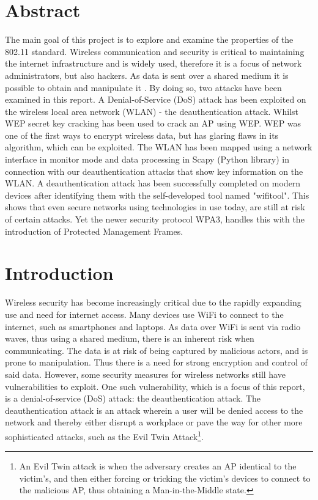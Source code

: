 \section*{Abstract}
The main goal of this project is to explore and examine the properties of the 802.11 standard. Wireless communication and security is critical to maintaining the internet infrastructure and is widely used, therefore it is a focus of network administrators, but also hackers. As data is sent over a shared medium it is possible to obtain and manipulate it . By doing so, two attacks have been examined in this report. A Denial-of-Service (DoS) attack has been exploited on the wireless local area network (WLAN) - the deauthentication attack. Whilst WEP secret key cracking has been used to crack an AP using WEP. WEP was one of the first ways to encrypt wireless data, but has glaring flaws in its algorithm, which can be exploited. The WLAN has been mapped using a network interface in monitor mode and data processing in Scapy (Python library) in connection with our deauthentication attacks that show key information on the WLAN. A deauthentication attack has been successfully completed on modern devices after identifying them with the self-developed tool named "wifitool". This shows that even secure networks using technologies in use today, are still at risk of certain attacks. Yet the newer security protocol WPA3, handles this with the introduction of Protected Management Frames.

\newpage
\tableofcontents
\newpage

\section{Introduction}
Wireless security has become increasingly critical due to the rapidly expanding use and need for internet access. Many devices use WiFi to connect to the internet, such as smartphones and laptops. As data over WiFi is sent via radio waves, thus using a shared medium, there is an inherent risk when communicating. The data is at risk of being captured by malicious actors, and is prone to manipulation. Thus there is a need for strong encryption and control of said data. However, some security measures for wireless networks still have vulnerabilities to exploit. One such vulnerability, which is a focus of this report, is a denial-of-service (DoS) attack: the deauthentication attack. The deauthentication attack is an attack wherein a user will be denied access to the network and thereby either disrupt a workplace or pave the way for other more sophisticated attacks, such as the Evil Twin Attack\footnote{An Evil Twin attack is when the adversary creates an AP identical to the victim's, and then either forcing or tricking the victim's devices to connect to the malicious AP, thus obtaining a Man-in-the-Middle state.}.


